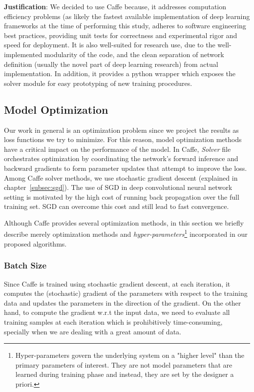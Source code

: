 \textbf{Justification}: We decided to use Caffe because, it addresses computation efficiency problems (as likely the fastest available implementation of deep learning frameworks at the time of performing this study, adheres to software engineering best practices, providing unit tests for correctness and experimental rigor and speed for deployment. It is also well-suited for research use, due to the well-implemented modularity of the code, and the clean separation of network definition (usually the novel part of deep learning research) from actual implementation\cite{jia2014caffe}. In addition, it provides a python wrapper which exposes the solver module for easy prototyping of new training procedures. 

\subsection{Model Optimization}

Our work in general is an optimization problem since we project the results as loss functions we try to minimize. For this reason, model optimization methods have a critical impact on the performance of the model. In Caffe, \textit{Solver} file orchestrates optimization by coordinating the network's forward inference and backward gradients to form parameter updates that attempt to improve the loss. Among Caffe solver methods, we use stochastic gradient descent (explained in chapter~\ref{subsec:sgd}). The use of SGD in deep convolutional neural network setting is motivated by the high cost of running back propagation over the full training set. SGD can overcome this cost and still lead to fast convergence. 

Although Caffe provides several optimization methods, in this section we briefly describe merely optimization methods and \textit{hyper-parameters}\footnote{Hyper-parameters govern the underlying system on a "higher level" than the primary parameters of interest. They are not model parameters that are learned during training phase and instead, they are set by the designer a priori.} incorporated in our proposed algorithms.


\subsubsection{Batch Size}

Since Caffe is trained using stochastic gradient descent, at each iteration, it computes the (stochastic) gradient of the parameters with respect to the training data and updates the parameters in the direction of the gradient. On the other hand, to compute the gradient w.r.t the input data, we need to evaluate all training samples at each iteration which is prohibitively time-consuming, specially when we are dealing with a great amount of data. 

